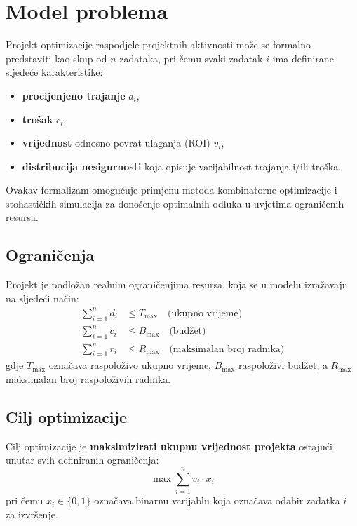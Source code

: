 \section{Model problema}
\label{sec:model_problema}

Projekt optimizacije raspodjele projektnih aktivnosti može se formalno predstaviti kao skup od $n$ zadataka, pri čemu svaki zadatak $i$ ima definirane sljedeće karakteristike:
\begin{itemize}
    \item \textbf{procijenjeno trajanje} $d_i$,
    \item \textbf{trošak} $c_i$,
    \item \textbf{vrijednost} odnosno povrat ulaganja (ROI) $v_i$,
    \item \textbf{distribucija nesigurnosti} koja opisuje varijabilnost trajanja i/ili troška.
\end{itemize}

Ovakav formalizam omogućuje primjenu metoda kombinatorne optimizacije \cite{Glover1986} i stohastičkih simulacija \cite{Law2015} za donošenje optimalnih odluka u uvjetima ograničenih resursa.

\subsection{Ograničenja}
Projekt je podložan realnim ograničenjima resursa, koja se u modelu izražavaju na sljedeći način:
\begin{align}
    \sum_{i=1}^n d_i &\leq T_{\mathrm{max}} \quad \text{(ukupno vrijeme)} \label{eq:time_constraint} \\
    \sum_{i=1}^n c_i &\leq B_{\mathrm{max}} \quad \text{(budžet)} \label{eq:budget_constraint} \\
    \sum_{i=1}^n r_i &\leq R_{\mathrm{max}} \quad \text{(maksimalan broj radnika)} \label{eq:workers_constraint}
\end{align}
gdje $T_{\mathrm{max}}$ označava raspoloživo ukupno vrijeme, $B_{\mathrm{max}}$ raspoloživi budžet, a $R_{\mathrm{max}}$ maksimalan broj raspoloživih radnika.

\subsection{Cilj optimizacije}
Cilj optimizacije je \textbf{maksimizirati ukupnu vrijednost projekta} ostajući unutar svih definiranih ograničenja:
\begin{equation}
    \max \sum_{i=1}^n v_i \cdot x_i
    \label{eq:objective}
\end{equation}
pri čemu $x_i \in \{0,1\}$ označava binarnu varijablu koja označava odabir zadatka $i$ za izvršenje.

